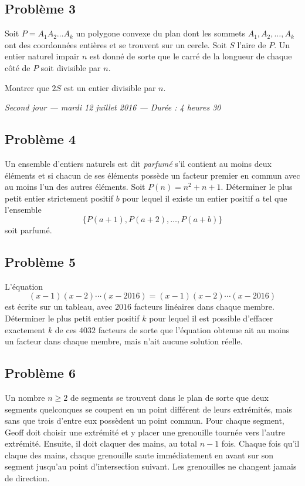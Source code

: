 \subsection*{Problème 3}
Soit $P = A_1A_2\ldots A_k$ un polygone convexe du plan dont les sommets $A_1, A_2, \ldots, A_k$ ont des
coordonnées entières et se trouvent sur un cercle. Soit $S$ l'aire de $P$. Un entier naturel impair $n$ est
donné de sorte que le carré de la longueur de chaque côté de $P$ soit divisible par $n$.

Montrer que $2S$ est un entier divisible par $n$.

\bigskip
\begin{center}
  \emph{Second jour --- mardi 12 juillet 2016 --- Durée : 4 heures 30}
\end{center}

\subsection*{Problème 4}
Un ensemble d'entiers naturels est dit \emph{parfumé} s'il contient au moins deux éléments et si chacun de ses
éléments possède un facteur premier en commun avec au moins l'un des autres éléments. Soit
$P(n) = n^2 + n + 1$. Déterminer le plus petit entier strictement positif $b$ pour lequel il existe un entier
positif $a$ tel que l'ensemble
\[
\{P(a+1), P(a+2), \ldots, P(a+b)\}
\]
soit parfumé.

\subsection*{Problème 5}
L'équation
\[
(x-1)(x-2)\cdots(x-2016) = (x-1)(x-2)\cdots(x-2016)
\]
est écrite sur un tableau, avec $2016$ facteurs linéaires dans chaque membre. Déterminer le plus petit entier
positif $k$ pour lequel il est possible d'effacer exactement $k$ de ces $4032$ facteurs de sorte que
l'équation obtenue ait au moins un facteur dans chaque membre, mais n'ait aucune solution réelle.

\subsection*{Problème 6}
Un nombre $n \geqslant 2$ de segments se trouvent dans le plan de sorte que deux segments quelconques se
coupent en un point différent de leurs extrémités, mais sans que trois d'entre eux possèdent un point commun.
Pour chaque segment, Geoff doit choisir une extrémité et y placer une grenouille tournée vers l'autre
extrémité. Ensuite, il doit claquer des mains, au total $n - 1$ fois. Chaque fois qu'il claque des mains,
chaque grenouille saute immédiatement en avant sur son segment jusqu'au point d'intersection suivant. Les
grenouilles ne changent jamais de direction.

